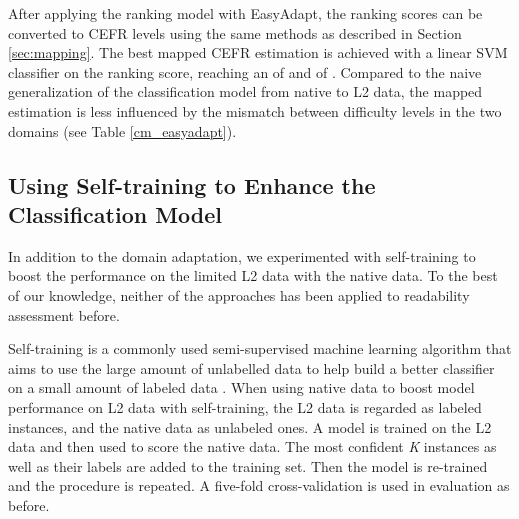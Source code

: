 \documentclass[11pt,letterpaper]{article}
\begin{document}
    After applying the ranking model with EasyAdapt, the ranking scores can be converted to CEFR levels using the same methods as described in Section \ref{sec:mapping}. The best mapped CEFR estimation is achieved with a linear SVM classifier on the ranking score, reaching an  of  and  of . Compared to the naive generalization of the classification model from native to L2 data, the mapped estimation is less influenced by the mismatch between difficulty levels in the two domains (see Table \ref{cm_easyadapt}).
    
        \begin{table}[t]
			\centering
			\small
			\caption{Confusion matrix of the mapped estimation after EasyAdapt application on one of the cross-validation folds}
			\label{cm_easyadapt}

		\end{table}
    

\subsection{Using Self-training to Enhance the Classification Model}

    In addition to the domain adaptation, we experimented with self-training to boost the performance on the limited L2 data with the native data. To the best of our knowledge, neither of the approaches has been applied to readability assessment before. 
    
    Self-training is a commonly used semi-supervised machine learning algorithm that aims to use the large amount of unlabelled data to help build a better classifier on a small amount of labeled data \cite{zhu2005semi}. When using native data to boost model performance on L2 data with self-training, the L2 data is regarded as labeled instances, and the native data as unlabeled ones. A model is trained on the L2 data and then used to score the native data. The most confident \textit{K} instances as well as their labels are added to the training set. Then the model is re-trained and the procedure is repeated. A five-fold cross-validation is used in evaluation as before.
    
\end{document}
